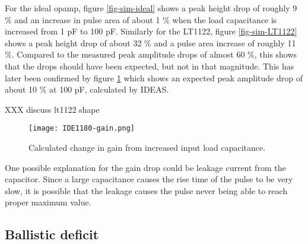 \documentclass[../main/thesis.tex]{subfiles}
\begin{document}
For the ideal \gls{opamp}, figure \ref{fig-sim-ideal} shows a peak height drop of roughly 9 \% and an increase in pulse area of about 1 \% when the load capacitance is increased from 1 pF to 100 pF. Similarly for the LT1122, figure \ref{fig-sim-LT1122} shows a peak height drop of about 32 \% and a pulse area increase of roughly 11 \%. Compared to the measured peak amplitude drops of almost 60 \%, this shows that the drops should have been expected, but not in that magnitude. This has later been confirmed by figure \ref{fig-ide-gain} which shows an expected peak amplitude drop of about 10 \% at 100 pF, calculated by IDEAS. 

XXX discuss lt1122 shape

\begin{figure}%
	\centering
	\texttt{[image: IDE1180-gain.png]}
	\caption{Calculated change in gain from increased input load capacitance. \citep{IDE1180email}}
	\label{fig-ide-gain}
\end{figure} 

One possible explanation for the gain drop could be leakage current from the capacitor. Since a large capacitance causes the rise time of the pulse to be very slow, it is possible that the leakage causes the pulse never being able to reach proper maximum value. 

\subsection{Ballistic deficit}
\label{ide-gain-ballistic}
\end{document}
